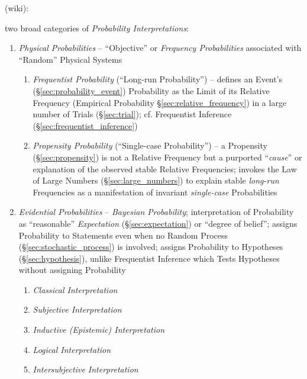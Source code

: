 (wiki):

two broad categories of \emph{Probability Interpretations}:
\begin{enumerate}
  \item \emph{Physical Probabilities} -- ``Objective'' or \emph{Frequency
    Probabilities} associated with ``Random'' Physical Systems
    \begin{enumerate}
      \item \emph{Frequentist Probability} (``Long-run Probability'') -- defines
        an Event's (\S\ref{sec:probability_event}) Probability as the Limit of
        its Relative Frequency (Empirical Probability
        \S\ref{sec:relative_frequency}) in a large number of Trials
        (\S\ref{sec:trial}); cf. Frequentist Inference
        (\S\ref{sec:frequentist_inference})
      \item \emph{Propensity Probability} (``Single-case Probability'') -- a
        Propensity (\S\ref{sec:propensity}) is not a Relative Frequency but a
        purported ``\emph{cause}'' or explanation of the observed stable
        Relative Frequencies; invokes the Law of Large Numbers
        (\S\ref{sec:large_numbers}) to explain stable \emph{long-run}
        Frequencies as a manifestation of invariant \emph{single-case}
        Probabilities
    \end{enumerate}
  \item \emph{Evidential Probabilities} -- \emph{Bayesian Probability};
    interpretation of Probability as ``reasonable'' \emph{Expectation}
    (\S\ref{sec:expectation}) or ``degree of belief''; assigns Probability to
    Statements even when no Random Process (\S\ref{sec:stochastic_process}) is
    involved; assigns Probability to Hypotheses (\S\ref{sec:hypothesis}), unlike
    Frequentist Inference which Tests Hypotheses without assigning Probability
    \begin{enumerate}
      \item \emph{Classical Interpretation}
      \item \emph{Subjective Interpretation}
      \item \emph{Inductive (Epistemic) Interpretation}
      \item \emph{Logical Interpretation}
      \item \emph{Intersubjective Interpretation}
    \end{enumerate}
\end{enumerate}

